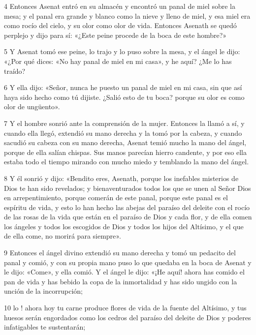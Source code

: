 \par 4 Entonces Asenat entró en su almacén y encontró un panal de miel sobre la mesa; y el panal era grande y blanco como la nieve y lleno de miel, y esa miel era como rocío del cielo, y su olor como olor de vida. Entonces Asenath se quedó perplejo y dijo para sí: «¿Este peine procede de la boca de este hombre?»

\par 5 Y Asenat tomó ese peine, lo trajo y lo puso sobre la mesa, y el ángel le dijo: «¿Por qué dices: «No hay panal de miel en mi casa», y he aquí? ¿Me lo has traído?

\par 6 Y ella dijo: «Señor, nunca he puesto un panal de miel en mi casa, sin que así haya sido hecho como tú dijiste. ¿Salió esto de tu boca? porque su olor es como olor de ungüento».

\par 7 Y el hombre sonrió ante la comprensión de la mujer. Entonces la llamó a sí, y cuando ella llegó, extendió su mano derecha y la tomó por la cabeza, y cuando sacudió su cabeza con su mano derecha, Asenat temió mucho la mano del ángel, porque de ella salían chispas. Sus manos parecían hierro candente, y por eso ella estaba todo el tiempo mirando con mucho miedo y temblando la mano del ángel.

\par 8 Y él sonrió y dijo: «Bendito eres, Asenath, porque los inefables misterios de Dios te han sido revelados; y bienaventurados todos los que se unen al Señor Dios en arrepentimiento, porque comerán de este panal, porque este panal es el espíritu de vida, y esto lo han hecho las abejas del paraíso del deleite con el rocío de las rosas de la vida que están en el paraíso de Dios y cada flor, y de ella comen los ángeles y todos los escogidos de Dios y todos los hijos del Altísimo, y el que de ella come, no morirá para siempre».

\par 9 Entonces el ángel divino extendió su mano derecha y tomó un pedacito del panal y comió, y con su propia mano puso lo que quedaba en la boca de Asenat y le dijo: «Come», y ella comió. Y el ángel le dijo: «¡He aquí! ahora has comido el pan de vida y has bebido la copa de la inmortalidad y has sido ungido con la unción de la incorrupción;

\par 10 lo ! ahora hoy tu carne produce flores de vida de la fuente del Altísimo, y tus huesos serán engordados como los cedros del paraíso del deleite de Dios y poderes infatigables te sustentarán;

